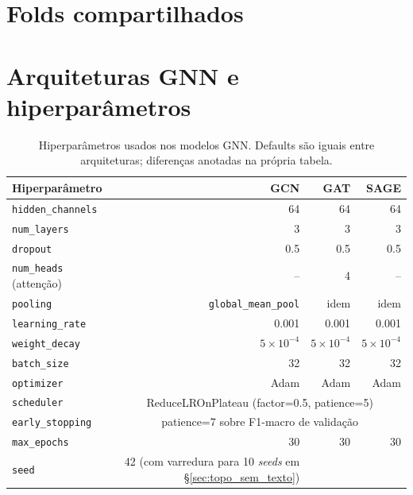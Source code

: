 \section{Folds compartilhados}
\label{sec:folds}


\section{Arquiteturas GNN e hiperpar\^ametros}
\label{sec:arquiteturas}


\begin{table}[H]\centering
\caption{Hiperpar\^ametros usados nos modelos GNN. Defaults s\~ao iguais
entre arquiteturas; diferen\c{c}as anotadas na pr\'opria tabela.}
\label{tab:hyperparams}
\small
\begin{tabular}{lrrr}
\toprule
\textbf{Hiperpar\^ametro} & \textbf{GCN} & \textbf{GAT} & \textbf{SAGE} \\
\midrule
\texttt{hidden\_channels}     & 64     & 64     & 64 \\
\texttt{num\_layers}          & 3      & 3      & 3 \\
\texttt{dropout}              & 0{.}5  & 0{.}5  & 0{.}5 \\
\texttt{num\_heads} (atten\c{c}\~ao) & --     & 4      & -- \\
\texttt{pooling}              & \texttt{global\_mean\_pool} & idem & idem \\
\texttt{learning\_rate}       & 0{.}001 & 0{.}001 & 0{.}001 \\
\texttt{weight\_decay}        & $5\times10^{-4}$ & $5\times10^{-4}$ & $5\times10^{-4}$ \\
\texttt{batch\_size}          & 32     & 32     & 32 \\
\texttt{optimizer}            & Adam   & Adam   & Adam \\
\texttt{scheduler}            & \multicolumn{3}{c}{ReduceLROnPlateau (factor=0{.}5, patience=5)} \\
\texttt{early\_stopping}      & \multicolumn{3}{c}{patience=7 sobre F1-macro de valida\c{c}\~ao} \\
\texttt{max\_epochs}          & 30     & 30     & 30 \\
\texttt{seed}                 & 42 (com varredura para 10 \emph{seeds} em \S\ref{sec:topo_sem_texto}) \\
\bottomrule
\end{tabular}
\end{table}

